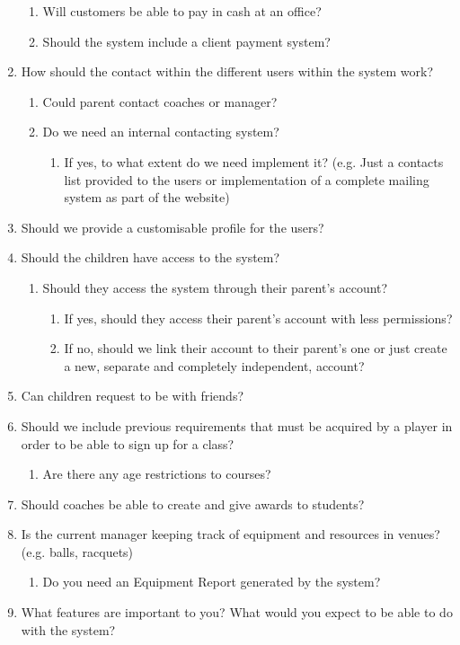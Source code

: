 \documentclass{l3proj}
\begin{document}
\begin{enumerate}
\begin{enumerate}
		\item Will customers be able to pay in cash at an office?
		\item Should the system include a client payment system?
		\end{enumerate}
\item How should the contact within the different users within the system work?
		\begin{enumerate}
		\item Could parent contact coaches or manager?
		\item Do we need an internal contacting system?
			\begin{enumerate}
			\item If yes, to what extent do we need implement it? (e.g. Just a contacts list provided to the users or implementation of a complete mailing system as part of the website)
			\end{enumerate}
		\end{enumerate}
\item Should we provide a customisable profile for the users?
\item Should the children have access to the system?
		\begin{enumerate}
		\item Should they access the system through their parent’s account?
			\begin{enumerate}
			\item If yes, should they access their parent's account with less permissions?
			\item If no, should we link their account to their parent’s one or just create a new, separate and completely independent, account?
			\end{enumerate}
		\end{enumerate}
\item Can children request to be with friends?
\item Should we include previous requirements that must be acquired by a player in order to be able to sign up for a class?
	\begin{enumerate}
	\item Are there any age restrictions to courses?
	\end{enumerate}
\item Should coaches be able to create and give awards to students?
\item Is the current manager keeping track of equipment and resources in venues? (e.g. balls, racquets)
	\begin{enumerate}
	\item Do you need an Equipment Report generated by the system?
	\end{enumerate}
\item What features are important to you? What would you expect to be able to do with the system?



\end{enumerate}
\end{document}
